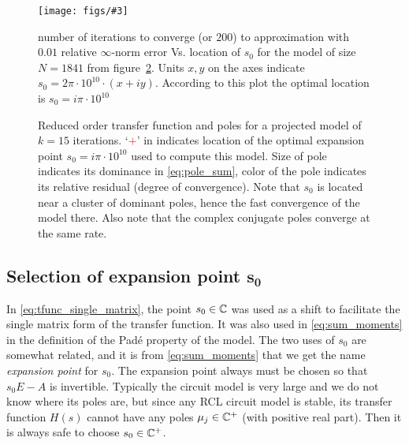\documentclass[letterpaper]{article}
\newcommand{\putfig}[3][{560 420}]{\texttt{[image: figs/\#3]}} %
\theoremstyle{remark}
\begin{document}
\begin{description}
  \begin{figure}[htbp]
		\centering
		\putfig[{646 510}]{.65}{ex1841s_3_proj_2D.png}
		\caption{number of iterations to converge (or $200$) to approximation with $0.01$ 
		relative $\infty$-norm error Vs. location of $s_0$ for the model 
		of size $N=1841$ from
		figure~\ref{fig:ex1841s3rm}. 
		Units $x,y$ on the axes indicate  $s_0=2\pi\cdot 10^{10}\cdot(x+iy)$.
		According to this plot the optimal location is 
		$s_0=i \pi \cdot 10^{10}$}
		\label{fig:ex1841s32Dcvg}
   \end{figure}
   
    \begin{figure}[htbp]
		\centering
		\subfloat[\label{ppa}]{\putfig{.48}{ex1841k15.png}}\hfill
		\subfloat[\label{ppb}]{\putfig{.48}{ex1841k15pol.png}}
		\caption{Reduced order transfer function  and poles
		 for a projected model
		of $k=15$ iterations. `\textcolor{red}{$+$}'  in 
		indicates location of the optimal expansion point
		$s_0=i\pi\cdot 10^{10}$ used
		to compute this model. Size of pole indicates its dominance in 
		\eqref{eq:pole_sum}, color of the pole indicates its relative residual 
		(degree of convergence).  Note that $s_0$ is located near a cluster of 
		dominant poles, hence the fast convergence of the model there. 
		Also note that the complex conjugate poles converge
		at the same rate.}
		\label{fig:ex1841s3rm}
   \end{figure}
   
   \subsection{Selection of expansion point $\bm{s_0}$}
   \label{sec:s0_selection}
  
   In \eqref{eq:tfunc_single_matrix}, the point $s_0\in\mathbb{C}$ was used as a shift  to 
   facilitate the single matrix form of the transfer function.  It was also 
   used in \eqref{eq:sum_moments} in the definition of the Pad\'e property of the
   model. The two uses of $s_0$ are somewhat related, and it is from 
   \eqref{eq:sum_moments}
   that we get the name \emph{expansion point} for $s_0$.  The expansion point
   always must be chosen so that $s_0E-A$ is invertible.  Typically the circuit 
   model is very large and we do not know where its poles are, but since any RCL
   circuit model
   is stable, its transfer function $H(s)$ cannot have any poles $\mu_j\in\mathbb{C}^+$
   (with positive real part).  Then it is always safe to choose $s_0\in\mathbb{C}^+$.   
    

\end{description}
\end{document}
